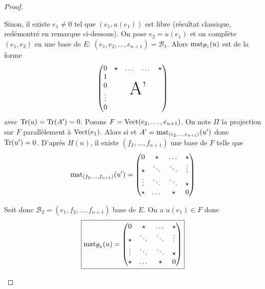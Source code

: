 \documentclass[12pt]{article}
\begin{document}
\begin{proof}
\begin{enumerate}
        Sinon, il existe $e_{1}\neq0$ tel que $(e_{1},u(e_{1}))$ est libre (résultat classique, redémontré en remarque ci-dessous). On pose $e_{2}=u(e_{1})$ et on complète $(e_{1},e_{2})$ en une base de $E$: $(e_{1},e_{2},\dots,e_{n+1})=\mathcal{B}_{1}$. Alors $\operatorname{mat}_{\mathcal{B}_{1}}(u)$ est de la forme 
        \begin{equation}
            \begin{pmatrix}
                0 & 
                \begin{matrix}
                    \star & \dots & \dots & \star    
                \end{matrix}\\
                \begin{matrix}
                    1\\
                    0\\
                    \vdots\\
                    0
                \end{matrix}
                & \mbox{\Huge A'}
            \end{pmatrix}
        \end{equation}
        avec $\operatorname{Tr}(u)=\operatorname{Tr}(A')=0$. Posons $F=\operatorname{Vect}(e_{2},\dots,e_{n+1})$. On note $\Pi$ la projection sur $F$ parallèlement à $\operatorname{Vect}(e_{1})$. Alors si 
        et $A'=\operatorname{mat}_{(e_{2},\dots,e_{n+1})}(u')$ donc $\operatorname{Tr}(u')=0$. D'après $H(n)$, il existe $(f_{2},\dots,f_{n+1})$ une base de $F$ telle que 
        \begin{equation}
            \operatorname{mat}_{(f_{2},\dots,f_{n+1})}(u')=
            \begin{pmatrix}
                0 & \star & \dots & \star\\
                \star & \ddots & \ddots & \vdots\\
                \vdots & \ddots & \ddots & \star\\
                \star & \dots & \star &0
            \end{pmatrix}
        \end{equation}

        Soit donc $\mathcal{B}_{2}=(e_{1},f_{2},\dots,f_{n+1})$ base de $E$. On a $u(e_{1})\in F$ donc 
        \begin{equation}
            \boxed{
            \operatorname{mat}_{\mathcal{B}_{2}}(u)=
            \begin{pmatrix}
                0 & \star & \dots & \star\\
                \star & \ddots & \ddots & \vdots\\
                \vdots & \ddots & \ddots & \star\\
                \star & \dots & \star &0
            \end{pmatrix}
            }
        \end{equation}


\end{enumerate}
\end{proof}
\end{document}

